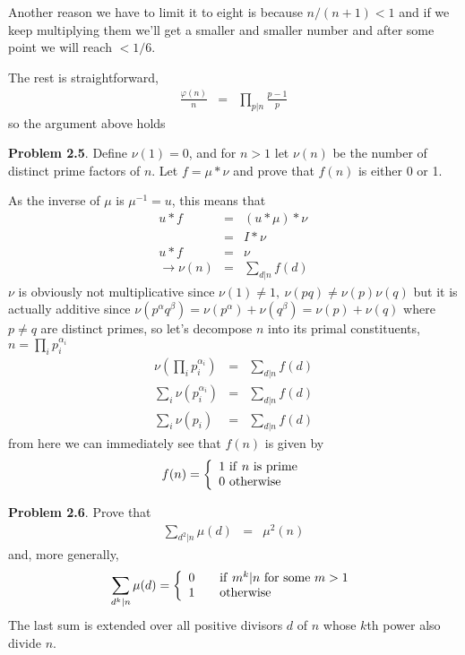 \documentclass[aps,preprint,preprintnumbers,nofootinbib,showpacs,prd]{revtex4-1}
\newcommand{\nbea}{\begin{eqnarray*}}
\newcommand{\neea}{\end{eqnarray*}}
\begin{document}
Another reason we have to limit it to eight is because $n/(n+1) < 1$ and if we keep multiplying them we'll get a smaller and smaller number and after some point we will reach $< 1/6$.

The rest is straightforward,
%
\nbea
\frac{\varphi(n)}{n} & = & \prod_{p|n}\frac{p - 1}{p}
\neea
%
so the argument above holds

{\bf Problem 2.5}. Define $\nu(1) = 0$, and for $n > 1$ let $\nu(n)$ be the number of distinct prime factors of $n$. Let $f = \mu * \nu$ and prove that $f(n)$ is either 0 or 1.

As the inverse of $\mu$ is $\mu^{-1} = u$, this means that
%
\nbea
u * f & = & (u * \mu) * \nu \\
& = & I * \nu \\
u * f & = & \nu \\
\to \nu(n) & = & \sum_{d|n} f(d)
\neea
%
$\nu$ is obviously not multiplicative since $\nu(1) \neq 1,~\nu(pq) \neq \nu(p)\nu(q)$ but it is actually additive since $\nu(p^\alpha q^\beta) = \nu(p^\alpha) + \nu(q^\beta) = \nu(p) + \nu(q)$ where $p \neq q$ are distinct primes, so let's decompose $n$ into its primal constituents, $n = \prod_i p_i^{\alpha_i}$
%
\nbea
\nu\left(\prod_i p_i^{\alpha_i}\right) & = & \sum_{d|n} f(d) \\
\sum_i \nu\left(p_i^{\alpha_i}\right) & = & \sum_{d|n} f(d) \\
\sum_i \nu\left(p_i\right) & = & \sum_{d|n} f(d)
\neea
%
from here we can immediately see that $f(n)$ is given by
%
\nbea
f(n) = \left\{
\begin{array}{l}
1 {\rm~if~} n {\rm ~is~prime} \\
0 {\rm~otherwise}
\end{array} \right.
\neea
%

{\bf Problem 2.6}. Prove that
%
\nbea
\sum_{d^2|n} \mu(d) & = & \mu^2(n)
\neea
%
and, more generally,
%
\nbea
\sum_{d^k|n} \mu(d) = \left \{
\begin{array}{l c l}
0 & & {\rm if~} m^k|n {\rm~for~some~} m > 1 \\
1 & & {\rm otherwise}
\end{array}\right.
\neea
%
The last sum is extended over all positive divisors $d$ of $n$ whose $k$th power also divide $n$.
\end{document}
